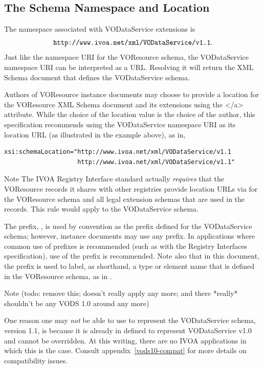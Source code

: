 \documentclass[11pt,a4paper]{ivoa}
\begin{document}
\subsection{The Schema Namespace and Location}


The namespace associated with VODataService extensions is
$$\mbox{\texttt{http://www.ivoa.net/xml/VODataService/v1.1}}.$$
Just like the namespace URI for the VOResource schema, the
VODataService namespace URI can be interpreted as a URL.  Resolving it
will return the XML Schema document 
that defines the VODataService schema.



Authors of VOResource instance documents may choose to
provide a location for the VOResource XML Schema document and its
extensions using the
</a> attribute.  While the choice of
the location value is the choice of the author, this specification
recommends using the VODataService namespace URI as its location URL
(as illustrated in the example above), as in,

\begin{lstlisting}[language=XML]
xsi:schemaLocation="http://www.ivoa.net/xml/VODataService/v1.1
                    http://www.ivoa.net/xml/VODataService/v1.1"
\end{lstlisting}


\begin{admonition}{Note}
The IVOA Registry Interface standard \citep{todo:RI1.1}
       actually \emph{requires} that the VOResource records it
       shares with other registries provide location URLs via
        for the VOResource schema and
       all legal extension schemas that are used in the records.  This
       rule would apply to the VODataService schema.
\end{admonition}


The prefix, , is used by convention as the prefix
defined for the VODataService schema; however, instance documents may
use any prefix.  In applications where common use of prefixes is
recommended (such as with the Registry Interfaces specification),
use of the  prefix is recommended.
Note also that in this document, the  prefix is used to
label, as shorthand, a type or element name that is defined in the
VOResource schema, as in .



\begin{admonition}{Note}
(todo: remove this; doesn't really apply any more; and there *really*
shouldn't be any VODS 1.0 around any more)

One reason one may \emph{not} be able to use 
       to represent the VODataService schema, version 1.1, is because
       it is already in defined to represent VODataService v1.0 and
       cannot be overridden.  At this writing, there are no IVOA
       applications in which this is the case.  Consult
       appendix~\ref{vods10-compat} for more details on
       compatibility issues.
\end{admonition}
\end{document}
